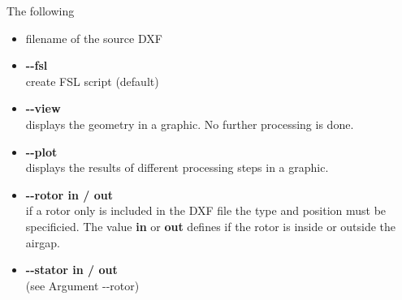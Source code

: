 \documentclass[10pt, a4paper,german]{scrartcl}
\newcommand{\Slanted}[1]{{\normalfont\slshape #1}}
\newcommand{\LongArg}[1]{\mbox{{-}{-}#1}}
\begin{document}
The following
\begin{itemize}
\item filename of the source DXF
\item {\bfseries{\LongArg{fsl}}}\\
      create FSL script (default)


\item {\bfseries{\LongArg{view}}}\\
		displays the geometry in a graphic. No further processing is done.

\item {\bfseries{\LongArg{plot}}}\\
		displays the results of different processing steps in a graphic.



\item {\bfseries{\LongArg{rotor} in / out}}\\
		if a rotor only is included in the DXF file the type and position must be specificied.
		The value  {\bfseries in}
		or {\bfseries out} defines if the rotor is inside or outside the airgap.

\item {\bfseries{\LongArg{stator} in / out}}\\
		(see Argument \LongArg{rotor})


\end{itemize}
\end{document}
